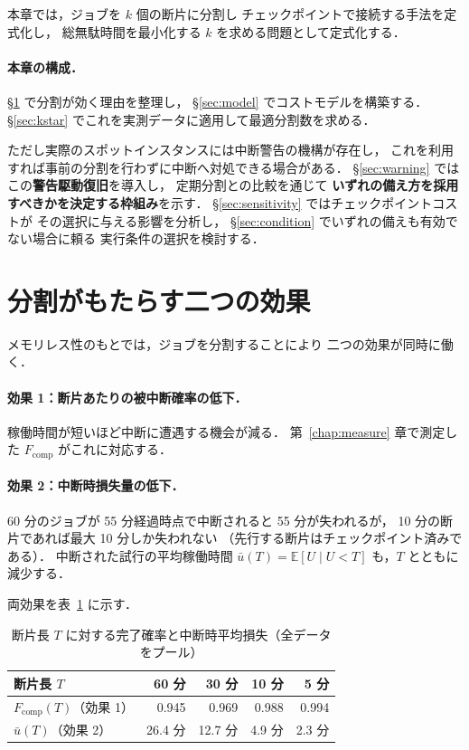 \documentclass[11pt,a4paper]{ltjsreport}
\newcommand{\Fcomp}{F_{\mathrm{comp}}}
\newcommand{\E}{\mathbb{E}}
\begin{document}
本章では，ジョブを $k$ 個の断片に分割し
チェックポイントで接続する手法を定式化し，
総無駄時間を最小化する $k$ を求める問題として定式化する．

\paragraph{本章の構成．}
\S\ref{sec:two_effects} で分割が効く理由を整理し，
\S\ref{sec:model} でコストモデルを構築する．
\S\ref{sec:kstar} でこれを実測データに適用して最適分割数を求める．

ただし実際のスポットインスタンスには中断警告の機構が存在し，
これを利用すれば事前の分割を行わずに中断へ対処できる場合がある．
\S\ref{sec:warning} ではこの\textbf{警告駆動復旧}を導入し，
定期分割との比較を通じて
\textbf{いずれの備え方を採用すべきかを決定する枠組み}を示す．
\S\ref{sec:sensitivity} ではチェックポイントコストが
その選択に与える影響を分析し，
\S\ref{sec:condition} でいずれの備えも有効でない場合に頼る
実行条件の選択を検討する．

\section{分割がもたらす二つの効果}
\label{sec:two_effects}

メモリレス性のもとでは，ジョブを分割することにより
二つの効果が同時に働く．

\paragraph{効果 1：断片あたりの被中断確率の低下．}
稼働時間が短いほど中断に遭遇する機会が減る．
第~\ref{chap:measure} 章で測定した $\Fcomp$ がこれに対応する．

\paragraph{効果 2：中断時損失量の低下．}
60 分のジョブが 55 分経過時点で中断されると 55 分が失われるが，
10 分の断片であれば最大 10 分しか失われない
（先行する断片はチェックポイント済みである）．
中断された試行の平均稼働時間
$\bar u(T) = \E[U \mid U < T]$ も，$T$ とともに減少する．

両効果を表~\ref{tab:split_effect} に示す．

\begin{table}[htbp]
\centering
\caption{断片長 $T$ に対する完了確率と中断時平均損失（全データをプール）}
\label{tab:split_effect}
\small
\begin{tabular}{@{}lrrrr@{}}
\toprule
断片長 $T$ & 60 分 & 30 分 & 10 分 & 5 分 \\
\midrule
$\Fcomp(T)$（効果 1） & 0.945 & 0.969 & 0.988 & 0.994 \\
$\bar u(T)$（効果 2） & 26.4 分 & 12.7 分 & 4.9 分 & 2.3 分 \\
\bottomrule
\end{tabular}
\end{table}
\end{document}
